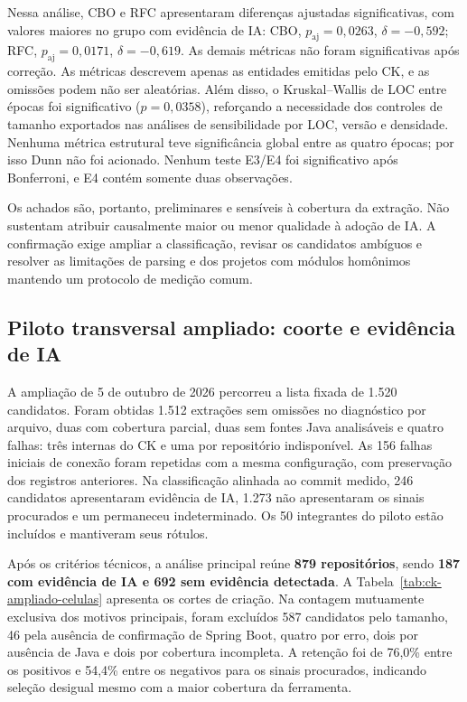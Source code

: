 Nessa análise, CBO e RFC apresentaram diferenças ajustadas significativas, com valores maiores no grupo com evidência de IA: CBO, $p_{\mathrm{aj}}=0,0263$, $\delta=-0,592$; RFC, $p_{\mathrm{aj}}=0,0171$, $\delta=-0,619$. As demais métricas não foram significativas após correção. As métricas descrevem apenas as entidades emitidas pelo CK, e as omissões podem não ser aleatórias. Além disso, o Kruskal--Wallis de LOC entre épocas foi significativo ($p=0,0358$), reforçando a necessidade dos controles de tamanho exportados nas análises de sensibilidade por LOC, versão e densidade. Nenhuma métrica estrutural teve significância global entre as quatro épocas; por isso Dunn não foi acionado. Nenhum teste E3/E4 foi significativo após Bonferroni, e E4 contém somente duas observações.

Os achados são, portanto, preliminares e sensíveis à cobertura da extração. Não sustentam atribuir causalmente maior ou menor qualidade à adoção de IA. A confirmação exige ampliar a classificação, revisar os candidatos ambíguos e resolver as limitações de parsing e dos projetos com módulos homônimos mantendo um protocolo de medição comum.


\subsection{Piloto transversal ampliado: coorte e evidência de IA}
\label{subsec:res-ampliacao-ck}

A ampliação de 5 de outubro de 2026 percorreu a lista fixada de 1.520 candidatos. Foram obtidas 1.512 extrações sem omissões no diagnóstico por arquivo, duas com cobertura parcial, duas sem fontes Java analisáveis e quatro falhas: três internas do CK e uma por repositório indisponível. As 156 falhas iniciais de conexão foram repetidas com a mesma configuração, com preservação dos registros anteriores. Na classificação alinhada ao commit medido, 246 candidatos apresentaram evidência de IA, 1.273 não apresentaram os sinais procurados e um permaneceu indeterminado. Os 50 integrantes do piloto estão incluídos e mantiveram seus rótulos.

Após os critérios técnicos, a análise principal reúne \textbf{879 repositórios}, sendo \textbf{187 com evidência de IA e 692 sem evidência detectada}. A Tabela~\ref{tab:ck-ampliado-celulas} apresenta os cortes de criação. Na contagem mutuamente exclusiva dos motivos principais, foram excluídos 587 candidatos pelo tamanho, 46 pela ausência de confirmação de Spring Boot, quatro por erro, dois por ausência de Java e dois por cobertura incompleta. A retenção foi de 76,0\% entre os positivos e 54,4\% entre os negativos para os sinais procurados, indicando seleção desigual mesmo com a maior cobertura da ferramenta.


